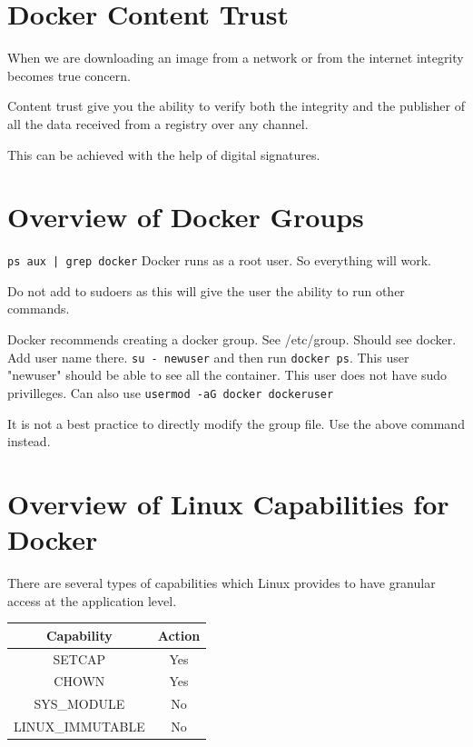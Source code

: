 \documentclass[11pt]{book}
\begin{document}
    \section{Docker Content Trust}
    When we are downloading an image from a network or from the internet integrity becomes true concern.

    Content trust give you the ability to verify both the integrity and the publisher of all the data received from a registry over any channel.

    This can be achieved with the help of digital signatures.

    \section{Overview of Docker Groups}
    \texttt{ps aux | grep docker} Docker runs as a root user. So everything will work.

    Do not add to sudoers as this will give the user the ability to run other commands.

    Docker recommends creating a docker group.
    See /etc/group. Should see docker. Add user name there.
    \texttt{su - newuser} and then run \texttt{docker ps}.
    This user "newuser" should be able to see all the container.
    This user does not have sudo privilleges.
    Can also use \texttt{usermod -aG docker dockeruser}

    It is not a best practice to directly modify the group file. Use the above command instead.


    \section{Overview of Linux Capabilities for Docker}

    There are several types of capabilities which Linux provides to have granular access at the application level.

    \begin{table}[ht]
        \centering
        \begin{tabular}{|c|c|}
            \hline
            Capability         & Action \\ \hline
            SETCAP         & Yes \\ \hline
            CHOWN         & Yes \\ \hline
            SYS_MODULE         & No \\ \hline
            LINUX_IMMUTABLE         & No \\ \hline
        \end{tabular}
    \end{table}
\end{document}
